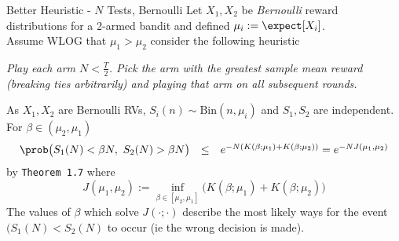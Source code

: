 \documentclass[11pt,a4paper]{article}
\begin{document}
  \begin{proposition}{Better Heuristic - $N$ Tests, Bernoulli}
    Let $X_1,X_2$ be \textit{Bernoulli} reward distributions for a 2-armed bandit and defined $\mu_i:=\expect[X_i]$.\\
    Assume WLOG that $\mu_1>\mu_2$ consider the following heuristic
    \begin{center}
      \textit{Play each arm $N<\frac{T}2$. Pick the arm with the greatest sample mean reward (breaking ties arbitrarily) and playing that arm on all subsequent rounds.}
    \end{center}
    As $X_1,X_2$ are Bernoulli RVs, $S_i(n)\sim\text{Bin}(n,\mu_i)$ and $S_1,S_2$ are independent.\\
    For $\beta\in(\mu_2,\mu_1)$
    \[\begin{array}{rcl}
      \prob\big(S_1(N)<\beta N,\ S_2(N)>\beta N\big)&\leq&e^{-N(K(\beta;\mu_1)+K(\beta;\mu_2))}=e^{-NJ(\mu_1,\mu_2)}
    \end{array}\]
    by \texttt{Theorem 1.7} where
    \[ J(\mu_1,\mu_2):=\inf_{\beta\in[\mu_2,\mu_1]}\big(K(\beta;\mu_1)+K(\beta;\mu_2)\big) \]
    The values of $\beta$ which solve $J(\cdot;\cdot)$ describe the most likely ways for the event $(S_1(N)<S_2(N)$ to occur (ie the wrong decision is made).
  \end{proposition}
\end{document}
